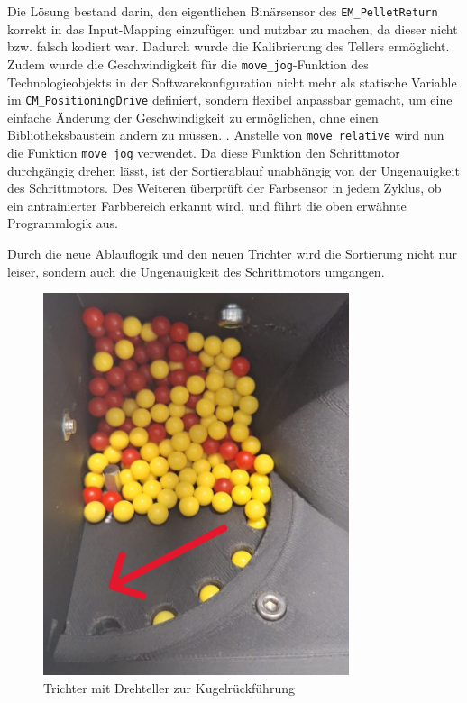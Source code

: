 Die Lösung bestand darin, den eigentlichen Binärsensor des \texttt{EM\_PelletReturn} korrekt in das Input-Mapping einzufügen und nutzbar zu machen, da dieser nicht bzw. falsch kodiert war. Dadurch wurde die Kalibrierung des Tellers ermöglicht. Zudem wurde die Geschwindigkeit für die \texttt{move\_jog}-Funktion des Technologieobjekts in der Softwarekonfiguration nicht mehr als statische Variable im \texttt{CM\_PositioningDrive} definiert, sondern flexibel anpassbar gemacht, um eine einfache Änderung der Geschwindigkeit zu ermöglichen, ohne einen Bibliotheksbaustein ändern zu müssen. . Anstelle von \texttt{move\_relative} wird nun die Funktion \texttt{move\_jog} verwendet. Da diese Funktion den Schrittmotor durchgängig drehen lässt, ist der Sortierablauf unabhängig von der Ungenauigkeit des Schrittmotors. Des Weiteren überprüft der Farbsensor in jedem Zyklus, ob ein antrainierter Farbbereich erkannt wird, und führt die oben erwähnte Programmlogik aus.  

Durch die neue Ablauflogik und den neuen Trichter wird die Sortierung nicht nur leiser, sondern auch die Ungenauigkeit des Schrittmotors umgangen.  

\begin{figure}[h!] %
    \centering  
    \includegraphics[width=0.8\textwidth]{figures/b15ba5c8-ba29-495a-9e40-18a8cdfba58f.PNG}
    \caption{Trichter mit Drehteller zur Kugelrückführung\cite{siemens2022}} 
    \label{fig:Trichter mit Drehteller zur Kugelrückführung} %
    \vspace{0.5em} %
    \small %
\end{figure}

